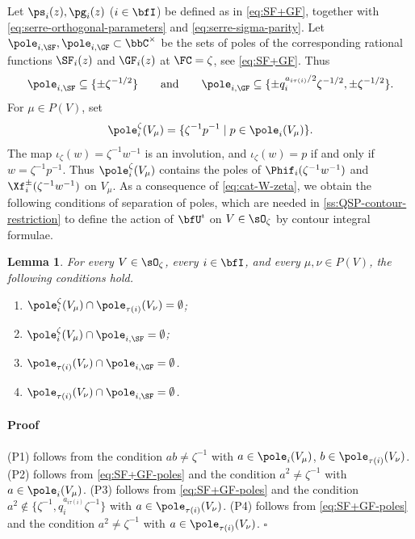 \documentclass[reqno]{amsart}
\numberwithin{equation}{section}
\newtheorem*{lemma}{Lemma}
\newenvironment{pf}{\medskip\paragraph{{\sc Proof}}}{\hfill$\square$\par\medskip}
\begin{document}
Let $\ps_i(z),\pg_i(z)$ ($i\in\bfI$) be 
defined as in \eqref{eq:SF+GF}, together with
\eqref{eq:serre-orthogonal-parameters} and \eqref{eq:serre-sigma-parity}. Let
$\pole_{i,\SF},\pole_{i,\GF}\subset\bbC^\times$ 
be the sets of poles of the corresponding rational functions $\SF_i(z)$ and $\GF_i(z)$ at
$\FC=\zeta$, see \eqref{eq:SF+GF}. Thus
\begin{equation}\label{eq:SF+GF-poles}
\pole_{i,\SF}\subseteq\{\pm\zeta^{-1/2}\}
\qquad\mbox{and}\qquad
\pole_{i,\GF}\subseteq
\{\pm q_i^{a_{i\tau(i)}/2}\zeta^{-1/2},\pm\zeta^{-1/2}\}.
\end{equation}
For $\mu\in P(V)$, set
\begin{equation}\label{eq:inverted-pole-set}
\pole_i^\zeta(V_\mu)
=
\{\zeta^{-1}p^{-1}\mid p\in\pole_i(V_\mu)\}.
\end{equation}
The map $\iota_\zeta(w)=\zeta^{-1}w^{-1}$ is an involution, and
$\iota_\zeta(w)=p$ if and only if $w=\zeta^{-1}p^{-1}$. Thus
$\pole_i^\zeta(V_\mu)$ contains the poles of
$\Phif_i(\zeta^{-1}w^{-1})$ and
$\Xf_i^\pm(\zeta^{-1}w^{-1})$ on $V_\mu$.
As a consequence of \eqref{eq:cat-W-zeta}, we obtain the following conditions of separation of poles, which are needed in \ref{ss:QSP-contour-restriction} to define the action of $\bfU^\imath$ on $V\in\sO_\zeta$ by contour integral formulae.

\begin{lemma}\label{eq:pole-symmetry}
For every $V\in\sO_\zeta$, every $i\in\bfI$, and every
$\mu,\nu\in P(V)$, the following conditions hold.
\begin{enumerate}[label=(P\arabic*)]\itemsep0.25cm
\item $\pole_i^\zeta(V_\mu)\cap\pole_{\tau(i)}(V_\nu)=\emptyset$;

\item $\pole_i^\zeta(V_\mu)\cap\pole_{i,\SF}=\emptyset$;

\item $\pole_{\tau(i)}(V_\nu)\cap\pole_{i,\GF}=\emptyset$.

\item $\pole_{\tau(i)}(V_\nu)\cap\pole_{i,\SF}=\emptyset$.
\end{enumerate}
\end{lemma}

\begin{pf}
(P1) follows from the condition $ab\neq\zeta^{-1}$ with $a\in\pole_i(V_\mu)$,  $b\in\pole_{\tau(i)}(V_\nu)$.
(P2) follows from \eqref{eq:SF+GF-poles} and the condition $a^2\neq\zeta^{-1}$ with $a\in\pole_i(V_\mu)$.
(P3) follows from \eqref{eq:SF+GF-poles} and the condition $a^2\not\in\{\zeta^{-1}, q_i^{a_{i\tau(i)}}\zeta^{-1}\}$ with $a\in\pole_{\tau(i)}(V_\nu)$.
(P4) follows from \eqref{eq:SF+GF-poles} and the condition
$a^2\neq\zeta^{-1}$ with $a\in\pole_{\tau(i)}(V_\nu)$.
\end{pf}
\end{document}
